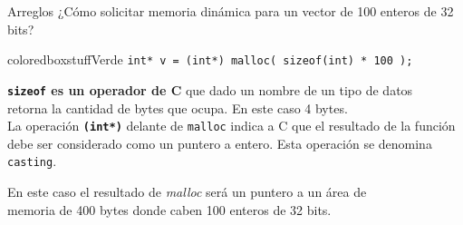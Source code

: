 \documentclass[aspectratio=169]{beamer}
\begin{document}
\begin{frame}[fragile]{Arreglos}
    ¿Cómo solicitar memoria dinámica para un vector de 100 enteros de 32 bits?\\
    \bigskip
    \pause
    \begin{beamercolorbox}[wd=0.9\textwidth,sep=0.5em]{coloredboxstuffVerde}
    \verb|int* v = (int*) malloc( sizeof(int) * 100 );|
    \end{beamercolorbox}
    \pause
    \bigskip
    \textbf{\texttt{sizeof} es un operador de C} que dado un nombre de un tipo de datos\\
    retorna la cantidad de bytes que ocupa. En este caso 4 bytes.\\
    \bigskip
    La operación \textbf{\texttt{(int*)}} delante de \texttt{malloc} indica a C que el resultado de la función\\
    debe ser considerado como un puntero a entero. Esta operación se denomina \texttt{casting}.\\
    \bigskip
    \begin{center}
    \textcolor{verdeuca}{
    En este caso el resultado de \emph{malloc} será un puntero a un área de\\ memoria de 400 bytes donde caben 100 enteros de 32 bits.
    }
    \end{center}
\end{frame}
\end{document}
